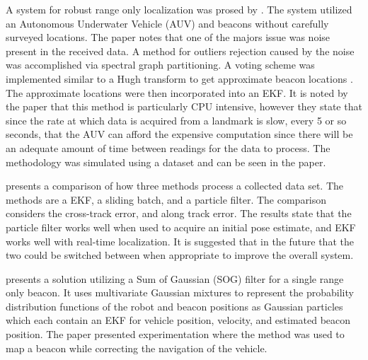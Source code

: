 \documentclass[conference]{IEEEtran}
\begin{document}
	A system for robust range only localization was prosed by \cite{Olson2006}. The system utilized an Autonomous Underwater Vehicle (AUV) and beacons without carefully surveyed locations. The paper notes that one of the majors issue was noise present in the received data. A method for outliers rejection caused by the noise was accomplished via spectral graph partitioning. A voting scheme was implemented similar to a Hugh transform to get approximate beacon locations \cite{Hough1959}. The approximate locations were then incorporated into an EKF. It is noted by the paper that this method is particularly CPU intensive, however they state that since the rate at which data is acquired from a landmark is slow, every 5 or so seconds, that the AUV can afford the expensive computation since there will be an adequate amount of time between readings for the data to process. The methodology was simulated using a dataset and can be seen in the paper.
	
	
	
	\cite{Kurth2003} presents a comparison of how three methods process a collected data set. The methods are a EKF, a sliding batch, and a particle filter. The comparison considers the cross-track error, and along track error. The results state that the particle filter works well when used to acquire an initial pose estimate, and EKF works well with real-time localization. It is suggested that in the future that the two could be switched between when appropriate to improve the overall system. 
	
	
	
	
	
	
	
	
	
	
	
	
	
	
	
	\cite{Vallicrosa2015} presents a solution utilizing a Sum of Gaussian (SOG) filter for a single range only beacon. It uses multivariate Gaussian mixtures to represent the probability distribution functions of the robot and beacon positions as Gaussian particles which each contain an EKF for vehicle position, velocity, and estimated beacon position. The paper presented experimentation where the method was used to map a beacon while correcting the navigation of the vehicle. 
	
\end{document}
